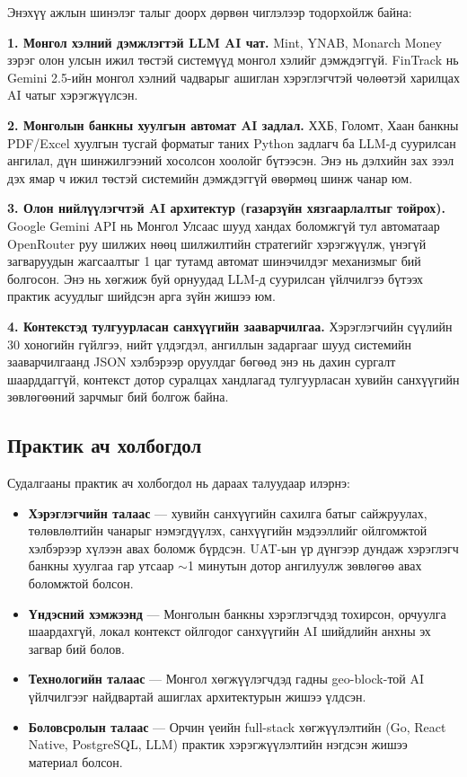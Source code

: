 Энэхүү ажлын шинэлэг талыг доорх дөрвөн чиглэлээр тодорхойлж байна:

\textbf{1. Монгол хэлний дэмжлэгтэй LLM AI чат.} Mint, YNAB, Monarch Money зэрэг олон улсын ижил төстэй системүүд монгол хэлийг дэмждэггүй. FinTrack нь Gemini 2.5-ийн монгол хэлний чадварыг ашиглан хэрэглэгчтэй чөлөөтэй харилцах AI чатыг хэрэгжүүлсэн.

\textbf{2. Монголын банкны хуулгын автомат AI задлал.} ХХБ, Голомт, Хаан банкны PDF/Excel хуулгын тусгай форматыг таних Python задлагч ба LLM-д суурилсан ангилал, дүн шинжилгээний хосолсон хоолойг бүтээсэн. Энэ нь дэлхийн зах зээл дэх ямар ч ижил төстэй системийн дэмждэггүй өвөрмөц шинж чанар юм.

\textbf{3. Олон нийлүүлэгчтэй AI архитектур (газарзүйн хязгаарлалтыг тойрох).} Google Gemini API нь Монгол Улсаас шууд хандах боломжгүй тул автоматаар OpenRouter руу шилжих нөөц шилжилтийн стратегийг хэрэгжүүлж, үнэгүй загваруудын жагсаалтыг 1 цаг тутамд автомат шинэчилдэг механизмыг бий болгосон. Энэ нь хөгжиж буй орнуудад LLM-д суурилсан үйлчилгээ бүтээх практик асуудлыг шийдсэн арга зүйн жишээ юм.

\textbf{4. Контекстэд тулгуурласан санхүүгийн зааварчилгаа.} Хэрэглэгчийн сүүлийн 30 хоногийн гүйлгээ, нийт үлдэгдэл, ангиллын задаргааг шууд системийн зааварчилгаанд JSON хэлбэрээр оруулдаг бөгөөд энэ нь дахин сургалт шаарддаггүй, контекст дотор суралцах хандлагад тулгуурласан хувийн санхүүгийн зөвлөгөөний зарчмыг бий болгож байна.

\subsection*{Практик ач холбогдол}

Судалгааны практик ач холбогдол нь дараах талуудаар илэрнэ:
\begin{itemize}
    \item \textbf{Хэрэглэгчийн талаас} --- хувийн санхүүгийн сахилга батыг сайжруулах, төлөвлөлтийн чанарыг нэмэгдүүлэх, санхүүгийн мэдээллийг ойлгомжтой хэлбэрээр хүлээн авах боломж бүрдсэн. UAT-ын үр дүнгээр дундаж хэрэглэгч банкны хуулгаа гар утсаар $\sim$1 минутын дотор ангилуулж зөвлөгөө авах боломжтой болсон.
    \item \textbf{Үндэсний хэмжээнд} --- Монголын банкны хэрэглэгчдэд тохирсон, орчуулга шаардахгүй, локал контекст ойлгодог санхүүгийн AI шийдлийн анхны эх загвар бий болов.
    \item \textbf{Технологийн талаас} --- Монгол хөгжүүлэгчдэд гадны geo-block-той AI үйлчилгээг найдвартай ашиглах архитектурын жишээ үлдсэн.
    \item \textbf{Боловсролын талаас} --- Орчин үеийн full-stack хөгжүүлэлтийн (Go, React Native, PostgreSQL, LLM) практик хэрэгжүүлэлтийн нэгдсэн жишээ материал болсон.
\end{itemize}

